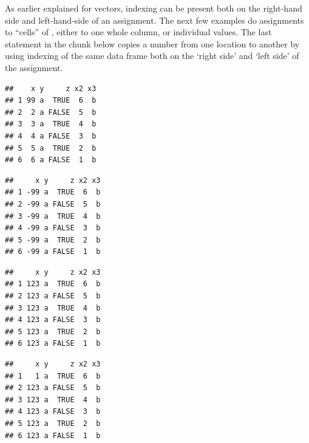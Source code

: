 \documentclass[krantz2]{krantz}\usepackage{knitr}%
\begin{document}
As earlier explained for vectors, indexing can be present both on the right-hand side and left-hand-side of an assignment.
The next few examples do assignments to ``cells'' of , either to one whole column, or individual values. The last statement in the chunk below copies a number from one location to another by using indexing of the same data frame both on the `right side' and `left side' of the assignment.

\begin{knitrout}\footnotesize
{}\color{fgcolor}\begin{kframe}
\begin{alltt}
\hlstd{a.df[}\hlstd{,} \hlstd{]} \hlkwb{<-} 
\end{alltt}
\begin{verbatim}
##    x y     z x2 x3
## 1 99 a  TRUE  6  b
## 2  2 a FALSE  5  b
## 3  3 a  TRUE  4  b
## 4  4 a FALSE  3  b
## 5  5 a  TRUE  2  b
## 6  6 a FALSE  1  b
\end{verbatim}
\begin{alltt}
\hlstd{a.df[ ,} \hlstd{]} \hlkwb{<-} \hlopt{-}
\end{alltt}
\begin{verbatim}
##     x y     z x2 x3
## 1 -99 a  TRUE  6  b
## 2 -99 a FALSE  5  b
## 3 -99 a  TRUE  4  b
## 4 -99 a FALSE  3  b
## 5 -99 a  TRUE  2  b
## 6 -99 a FALSE  1  b
\end{verbatim}
\begin{alltt}
\hlstd{a.df[[}\hlstd{]]} \hlkwb{<-} 
\end{alltt}
\begin{verbatim}
##     x y     z x2 x3
## 1 123 a  TRUE  6  b
## 2 123 a FALSE  5  b
## 3 123 a  TRUE  4  b
## 4 123 a FALSE  3  b
## 5 123 a  TRUE  2  b
## 6 123 a FALSE  1  b
\end{verbatim}
\begin{alltt}
\hlstd{a.df[}\hlstd{,} \hlstd{]} \hlkwb{<-} \hlstd{a.df[}\hlstd{,} \hlstd{]}
\end{alltt}
\begin{verbatim}
##     x y     z x2 x3
## 1   1 a  TRUE  6  b
## 2 123 a FALSE  5  b
## 3 123 a  TRUE  4  b
## 4 123 a FALSE  3  b
## 5 123 a  TRUE  2  b
## 6 123 a FALSE  1  b
\end{verbatim}
\end{kframe}
\end{knitrout}
\end{document}
